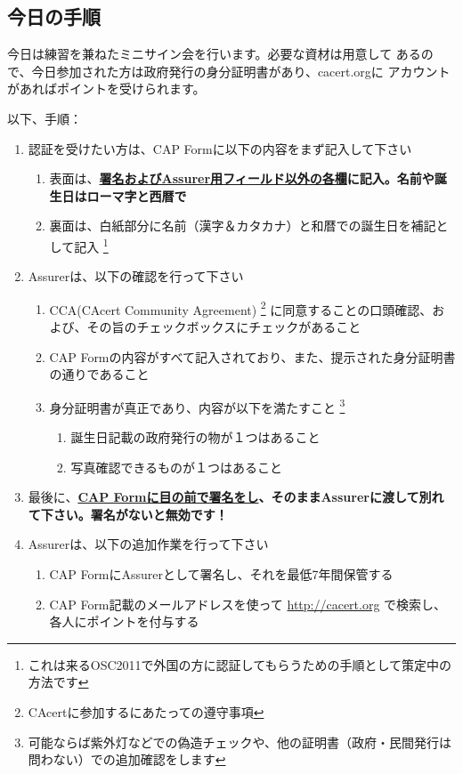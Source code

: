 \documentclass[mingoth,a4paper]{jsarticle}
\begin{document}
\subsection{今日の手順}
今日は練習を兼ねたミニサイン会を行います。必要な資材は用意して
あるので、今日参加された方は政府発行の身分証明書があり、cacert.orgに
アカウントがあればポイントを受けられます。

以下、手順：
\begin{enumerate}

\item 認証を受けたい方は、CAP Formに以下の内容をまず記入して下さい
\begin{enumerate}
\item 表面は、\bf{\underline{署名およびAssurer用フィールド以外の各欄}}に記入。名前や誕生日はローマ字と西暦で
\item 裏面は、白紙部分に名前（漢字＆カタカナ）と和暦での誕生日を補記として記入
\footnote{これは来るOSC2011で外国の方に認証してもらうための手順として策定中の方法です}
\end{enumerate}

\item Assurerは、以下の確認を行って下さい
\begin{enumerate}
\item CCA(CAcert Community Agreement)
\footnote{CAcertに参加するにあたっての遵守事項}
に同意することの口頭確認、および、その旨のチェックボックスにチェックがあること
\item CAP Formの内容がすべて記入されており、また、提示された身分証明書の通りであること
\item 身分証明書が真正であり、内容が以下を満たすこと
\footnote{可能ならば紫外灯などでの偽造チェックや、他の証明書（政府・民間発行は問わない）での追加確認をします}
\begin{enumerate}
\item 誕生日記載の政府発行の物が１つはあること
\item 写真確認できるものが１つはあること
\end{enumerate}
\end{enumerate}

\item 最後に、\bf{\underline{CAP Formに目の前で署名をし}}、そのままAssurerに渡して別れて下さい。署名がないと無効です！

\item Assurerは、以下の追加作業を行って下さい
\begin{enumerate}
\item CAP FormにAssurerとして署名し、それを最低7年間保管する
\item CAP Form記載のメールアドレスを使って \url{http://cacert.org} で検索し、各人にポイントを付与する
\end{enumerate}

\end{enumerate}
\end{document}

